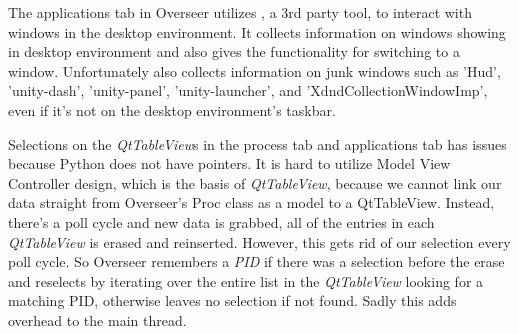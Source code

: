 \documentclass[12pt]{article}
\begin{document}
The applications tab in Overseer utilizes \cite{wmtrl}, a 3rd party tool, to interact with windows in the desktop environment.
It collects information on windows showing in desktop environment and also gives the functionality for switching to a window.
Unfortunately  also collects information on junk windows such as 'Hud', 'unity-dash', 'unity-panel', 'unity-launcher', and 'XdndCollectionWindowImp', even if it's not on the desktop environment's taskbar.

Selections on the \emph{QtTableView}s in the process tab and applications tab has issues because Python does not have pointers.
It is hard to utilize Model View Controller design, which is the basis of \emph{QtTableView}, because we cannot link our data straight from Overseer's Proc class as a model to a QtTableView.
Instead, there's a poll cycle and new data is grabbed, all of the entries in each \emph{QtTableView} is erased and reinserted.
However, this gets rid of our selection every poll cycle. 
So Overseer remembers a \emph{PID} if there was a selection before the erase and reselects by iterating over the entire list in the \emph{QtTableView} looking for a matching PID, otherwise leaves no selection if not found.
Sadly this adds overhead to the main thread.	
\end{document}
